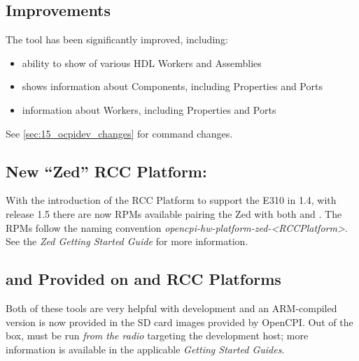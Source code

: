 \begin{itemize}
\setlength\itemsep{0em} %
\begin{multicols}{3}
\item[] 
\item[] 
\item[] 
\item[] 
\item[] 
\end{multicols}
\end{itemize}

\subsection{\ocpidev Improvements} %
\label{sec:15_ocpidev}
The \ocpidev tool has been significantly improved, including:
\begin{itemize}
\setlength\itemsep{0em} %
\item ability to show  of various HDL Workers and Assemblies %
\item {} shows information about Components, including Properties and Ports %
\item {} information about Workers, including Properties and Ports %
\end{itemize}
See \ref{sec:15_ocpidev_changes} for \ocpidev command changes.
\subsection{New ``Zed'' RCC Platform: } %
\label{sec:15_new_zed_rcc}
With the introduction of the RCC Platform  to support the E310 in 1.4, with release 1.5 there are now RPMs available pairing the Zed with both  and . The RPMs follow the naming convention \textit{opencpi-hw-platform-zed-\textless RCCPlatform\textgreater}. See the \textit{Zed Getting Started Guide} for more information.
\subsection{ and  Provided on  and  RCC Platforms} %
Both of these tools are very helpful with development and an ARM-compiled version is now provided in the SD card images provided by OpenCPI. Out of the box,  must be run \textit{from the radio} targeting the development host; more information is available in the applicable \textit{Getting Started Guides}.

